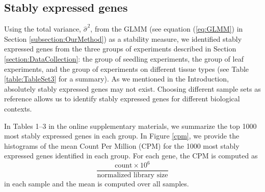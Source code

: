 \documentclass[letterpaper,12pt]{article}
\begin{document}
\subsection{Stably expressed genes}\label{section:stablyExpressedGene}
Using the total variance, $\hat\sigma^2$, from the GLMM (see
equation (\ref{eq:GLMM}) in Section \ref{subsection:OurMethod}) as a
stability measure, we identified stably expressed genes from the three groups
of experiments described in Section \ref{section:DataCollection}: the group of
seedling experiments, the group of leaf experiments, and the group of
experiments on different tissue types (see Table \ref{table:TableSet3} for a
summary).
As we mentioned in the Introduction, absolutely stably expressed genes may not
exist.  Choosing different sample sets as reference allows us to identify
stably expressed genes for different biological contexts.

In Tables 1--3 in the online supplementary materials, we summarize the
top 1000 most stably expressed genes in each group.  In Figure \ref{cpm}, we
provide the histograms of the mean Count Per Million (CPM) for the 1000
most stably expressed genes identified in each group. For each gene, the CPM
is computed as
\begin{equation}\label{eq:cpm}
 \dfrac{ \text{count} \times 10^6 }{ \text{normalized library size}} 
\end{equation}
in each sample and the mean is computed over all samples.
 
\end{document}
